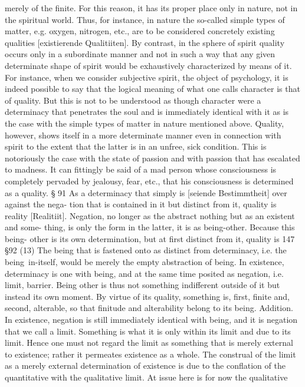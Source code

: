 merely of the finite. For this reason, it has its proper place only in nature, not
in the spiritual world. Thus, for instance, in nature the so-called simple types of
matter, e.g. oxygen, nitrogen, etc., are to be considered concretely existing qualities
[existierende Qualitiiten]. By contrast, in the sphere of spirit quality occurs only
in a subordinate manner and not in such a way that any given determinate shape
of spirit would be exhaustively characterized by means of it. For instance, when
we consider subjective spirit, the object of psychology, it is indeed possible to say
that the logical meaning of what one calls character is that of quality. But this
is not to be understood as though character were a determinacy that penetrates
the soul and is immediately identical with it as is the case with the simple types
of matter in nature mentioned above. Quality, however, shows itself in a more
determinate manner even in connection with spirit to the extent that the latter is
in an unfree, sick condition. This is notoriously the case with the state of passion
and with passion that has escalated to madness. It can fittingly be said of a mad
person whose consciousness is completely pervaded by jealousy, fear, etc., that his
consciousness is determined as a quality.
§ 91
As a determinacy that simply is [seiende Bestimmtheit] over against the nega-
tion that is contained in it but distinct from it, quality is reality [Realitiit].
Negation, no longer as the abstract nothing but as an existent and some-
thing, is only the form in the latter, it is as being-other. Because this being-
other is its own determination, but at first distinct from it, quality is
147
§92
(13) The being that is fastened onto as distinct from determinacy, i.e. the
being~in-itself, would be merely the empty abstraction of being. In existence,
determinacy is one with being, and at the same time posited as negation,
i.e. limit, barrier. Being other is thus not something indifferent outside of
it but instead its own moment. By virtue of its quality, something is, first,
finite and, second, alterable, so that finitude and alterability belong to its
being.
Addition. In existence, negation is still immediately identical with being, and it
is negation that we call a limit. Something is what it is only within its limit and
due to its limit. Hence one must not regard the limit as something that is merely
external to existence; rather it permeates existence as a whole. The construal of the
limit as a merely external determination of existence is due to the conflation of
the quantitative with the qualitative limit. At issue here is for now the qualitative
